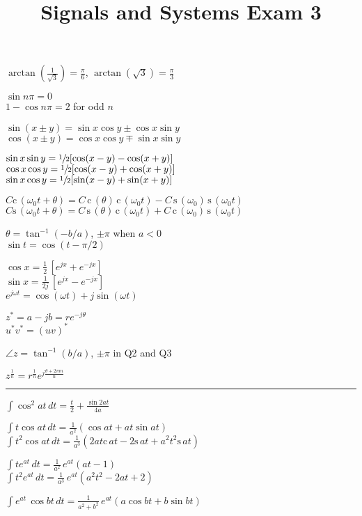 \documentclass[4pt]{article}
\title{Signals and Systems Exam 3}
\theoremstyle{definition}
\theoremstyle{definition}
\renewcommand{\c}{\mathrm{c}\,}
\newcommand{\s}{\mathrm{s}\,}
\renewcommand{\o}{\omega}
\begin{document}
\raggedright
\begin{multicols}{3} %
    $\arctan(\frac{1}{\sqrt{3}}) = \frac{\pi}{6}$,  $\arctan(\sqrt{3}) = \frac{\pi} 3$

    $\sin n\pi = 0$\\
    $1-\cos n\pi = 2$ for odd $n$

    $\sin(x\pm y) = \sin x \cos y \pm \cos x \sin y$\\
    $\cos(x\pm y) = \cos x \cos y \mp \sin x \sin y$

    $\sin x \sin y = \sfrac{1}{2}[\cos(x-y) - \cos(x+y)]$\\ %
    $\cos x \cos y = \sfrac{1}{2}[\cos(x-y) + \cos(x+y)]$\\
    $\sin x \cos y = \sfrac{1}{2}[\sin(x-y) + \sin(x+y)]$

    $C \c(\o_0 t + \theta) = C\,\c(\theta) \,\c(\o_0 t) - C\,\s(\o_0)\,\s(\o_0 t)$\\        %
    $C \s(\o_0 t + \theta) = C\,\s(\theta) \,\c(\o_0 t) + C\,\c(\o_0)\,\s(\o_0 t)$

    $\theta = \tan^{-1} (-b/a)$, $\pm \pi$ when $a<0$\\
    $\sin t = \cos (t-\pi/2)$

    $\cos x = \frac{1}{2}\,[e^{jx} + e^{-jx}]$\\
    $\sin x = \frac{1}{2j}\, [e^{jx} - e^{-jx}]$\\
    $e^{j\o t} = \cos(\o t) + j\sin (\o t)$

    $z^* = a-jb = re^{-j\theta}$\\
    $u^* v^* = (uv)^*$

    $\angle z = \tan^{-1}(b/a)$, $\pm \pi$ in Q2 and Q3

    $z^{\frac 1 n} = r^{\frac 1 n} e^{j \frac{\theta + 2\pi m}{n}}$
\rule{\linewidth}{0.5pt}
    $\int \cos^2 at \, dt = \frac{t}{2} + \frac{\sin2at}{4a}$

    $\int t \cos at \, dt = \frac{1}{a^2}(\cos at + at\sin at)$\\
    $\int t^2 \cos at\, dt = \frac{1}{a^3}(2at\c at - 2\s at + a^2t^2\s at)$

    $\int te^{at}\, dt = \frac{1}{a^2} \, e^{at} (at-1)$\\
    $\int t^2 e^{at} \, dt = \frac{1}{a^3} \, e^{at} (a^2t^2 - 2at + 2)$

    $\int e^{at} \,\cos bt \, dt = \frac{1}{a^2+b^2} \,e^{at}(a\cos 
    bt + b \sin bt)$


\end{multicols}
\end{document}
